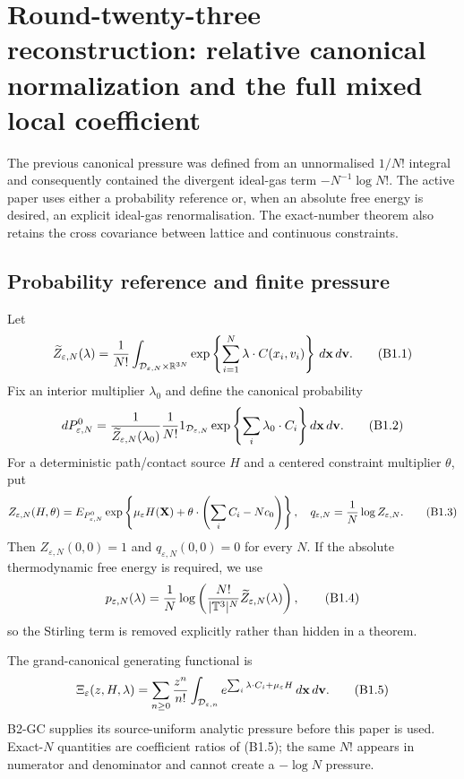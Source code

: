 \section{Round-twenty-three reconstruction: relative canonical normalization and the full mixed local coefficient}
\label{sec:r23-b1}

The previous canonical pressure was defined from an unnormalised
$1/N!$ integral and consequently contained the divergent ideal-gas term
$-N^{-1}\log N!$.  The active paper uses either a probability reference or,
when an absolute free energy is desired, an explicit ideal-gas
renormalisation.  The exact-number theorem also retains the cross covariance
between lattice and continuous constraints.

\subsection{Probability reference and finite pressure}

Let
\[
 \widetilde Z_{\varepsilon,N}(\lambda)
 ={1\over N!}\int_{\mathcal D_{\varepsilon,N}\times\mathbb R^{3N}}
 \exp\left\{\sum_{i=1}^N\lambda\cdot C(x_i,v_i)\right\}
 \,d\mathbf x\,d\mathbf v.                              \tag{B1.1}
\]
Fix an interior multiplier $\lambda_0$ and define the canonical probability
\[
 dP_{\varepsilon,N}^{0}
 ={1\over\widetilde Z_{\varepsilon,N}(\lambda_0)}
 {1\over N!}1_{\mathcal D_{\varepsilon,N}}
 \exp\left\{\sum_i\lambda_0\cdot C_i\right\}
 d\mathbf x\,d\mathbf v.                                \tag{B1.2}
\]
For a deterministic path/contact source $H$ and a centered constraint
multiplier $\theta$, put
\[
 Z_{\varepsilon,N}(H,\theta)
 =E_{P_{\varepsilon,N}^{0}}
 \exp\left\{\mu_\varepsilon H(\mathbf X)
 +\theta\cdot\left(\sum_iC_i-Nc_0\right)\right\},
 \quad q_{\varepsilon,N}={1\over N}\log Z_{\varepsilon,N}.             \tag{B1.3}
\]
Then $Z_{\varepsilon,N}(0,0)=1$ and
$q_{\varepsilon,N}(0,0)=0$ for every $N$.  If the absolute thermodynamic
free energy is required, we use
\[
 p_{\varepsilon,N}(\lambda)
 ={1\over N}\log\left(
 {N!\over |\mathbb T^3|^N}\widetilde Z_{\varepsilon,N}(\lambda)
 \right),                                                \tag{B1.4}
\]
so the Stirling term is removed explicitly rather than hidden in a theorem.

The grand-canonical generating functional is
\[
 \Xi_\varepsilon(z,H,\lambda)
 =\sum_{n\ge0}{z^n\over n!}
 \int_{\mathcal D_{\varepsilon,n}}
 e^{\sum_i\lambda\cdot C_i+\mu_\varepsilon H}
 \,d\mathbf x\,d\mathbf v.                              \tag{B1.5}
\]
B2-GC supplies its source-uniform analytic pressure before this paper is used.
Exact-$N$ quantities are coefficient ratios of (B1.5); the same $N!$ appears
in numerator and denominator and cannot create a $-\log N$ pressure.

